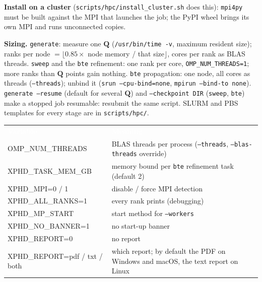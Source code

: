 \documentclass[10pt,a4paper]{article}
\newcommand{\hd}[1]{\textcolor{white}{\normalfont\bfseries #1}}
\newcommand{\hdrow}{\rowcolor{accent}}
\newcommand{\bQ}{\mathbf{Q}}
\begin{document}
\textbf{Install on a cluster} (\texttt{scripts/hpc/install\_cluster.sh} does this): \texttt{mpi4py} must be built against the
MPI that launches the job; the PyPI wheel brings its own MPI and runs unconnected copies.
\textbf{Sizing.} \texttt{generate}: measure one $\bQ$ (\texttt{/usr/bin/time -v}, maximum resident size); ranks per node
$=\times$ node memory / that size$\rfloor$, cores per rank as BLAS threads. \texttt{sweep} and the \texttt{bte} refinement:
one rank per core, \texttt{OMP\_NUM\_THREADS=1}; more ranks than $\bQ$ points gain nothing. \texttt{bte} propagation: one node,
all cores as threads (\texttt{--threads}); unbind it (\texttt{srun --cpu-bind=none}, \texttt{mpirun --bind-to none}).
\texttt{generate --resume} (default for several $\bQ$) and \texttt{--checkpoint DIR} (\texttt{sweep}, \texttt{bte}) make a stopped job
resumable: resubmit the same script. SLURM and PBS templates for every stage are in \texttt{scripts/hpc/}.

{\small\renewcommand{\arraystretch}{1.15}
\begin{tabularx}{\linewidth}{>{\ttfamily}p{5.0cm}X}
\hdrow \hd{Variable} & \hd{Meaning}\\
OMP\_NUM\_THREADS & BLAS threads per process (\texttt{--threads}, \texttt{--blas-threads} override)\\
XPHD\_TASK\_MEM\_GB & memory bound per \texttt{bte} refinement task (default 2)\\
XPHD\_MPI=0 / 1 & disable / force MPI detection\\
XPHD\_ALL\_RANKS=1 & every rank prints (debugging)\\
XPHD\_MP\_START & start method for \texttt{--workers}\\
XPHD\_NO\_BANNER=1 & no start-up banner\\
XPHD\_REPORT=0 & no report\\
XPHD\_REPORT=pdf / txt / both & which report; by default the PDF on Windows and macOS, the text report on Linux\\
\end{tabularx}}
\end{document}
